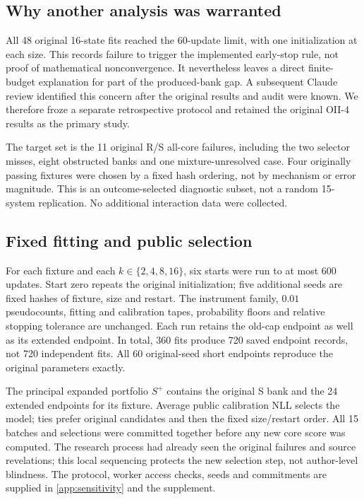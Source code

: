 \subsection{Why another analysis was warranted}
All 48 original 16-state fits reached the 60-update limit, with one initialization at each size. This records failure to trigger the implemented early-stop rule, not proof of mathematical nonconvergence. It nevertheless leaves a direct finite-budget explanation for part of the produced-bank gap. A subsequent Claude review identified this concern after the original results and audit were known. We therefore froze a separate retrospective protocol and retained the original OII-4 results as the primary study.

The target set is the 11 original R/S all-core failures, including the two selector misses, eight obstructed banks and one mixture-unresolved case. Four originally passing fixtures were chosen by a fixed hash ordering, not by mechanism or error magnitude. This is an outcome-selected diagnostic subset, not a random 15-system replication. No additional interaction data were collected.

\subsection{Fixed fitting and public selection}
For each fixture and each $k\in\{2,4,8,16\}$, six starts were run to at most 600 updates. Start zero repeats the original initialization; five additional seeds are fixed hashes of fixture, size and restart. The instrument family, $0.01$ pseudocounts, fitting and calibration tapes, probability floors and relative stopping tolerance are unchanged. Each run retains the old-cap endpoint as well as its extended endpoint. In total, 360 fits produce 720 saved endpoint records, not 720 independent fits. All 60 original-seed short endpoints reproduce the original parameters exactly.

The principal expanded portfolio $S^+$ contains the original S bank and the 24 extended endpoints for its fixture. Average public calibration NLL selects the model; ties prefer original candidates and then the fixed size/restart order. All 15 batches and selections were committed together before any new core score was computed. The research process had already seen the original failures and source revelations; this local sequencing protects the new selection step, not author-level blindness. The protocol, worker access checks, seeds and commitments are supplied in \cref{app:sensitivity} and the supplement.

